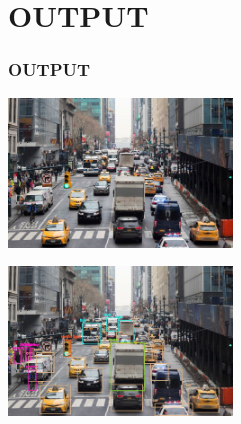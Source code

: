 \documentclass[
	11pt, %
	t, %
	aspectratio=169, %
]{beamer}
\begin{document}
\section{OUTPUT}
\begin{frame}
	\frametitle{OUTPUT}
	\bigskip  
		\begin{center}
		\begin{minipage}{0.45\textwidth}
			\includegraphics[height=150px,width=\textwidth]{before.jpeg}
		\end{minipage} \hspace{0.5cm}
		\begin{minipage}{0.45\textwidth}
			\includegraphics[height=150px,width=\textwidth]{after.jpeg}
		\end{minipage}
		\label{name_label}
	\end{center}
\end{frame}
\end{document}
